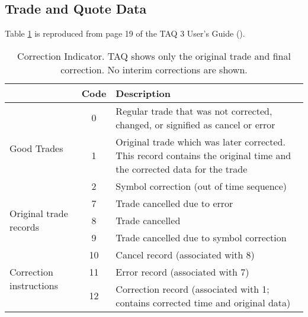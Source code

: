 \begin{landscape}

\section{Trade and Quote Data}
\label{appx:taq}

Table \ref{table:appx_taq_corr} is reproduced from page 19 of the TAQ 3 User's Guide (\cite{TAQUserGuide}).

\begin{table}
\centering

\begin{tabular}{l|c|l|}
    \cline{2-3}
	 & Code & Description \\
    \hline
    \multirow{3}{*}{Good Trades} & 0 & Regular trade that was not corrected, changed, or signified as cancel or error \\
     							 & 1 & Original trade which was later corrected. This record contains the original time and the corrected data for the trade \\
                                 & 2 & Symbol correction (out of time sequence) \\
    \hline
	\multirow{3}{*}{Original trade records} & 7 & Trade cancelled due to error \\
     							            & 8 & \textbullet Trade cancelled \\
                                            & 9 & Trade cancelled due to symbol correction \\
    \hline
    \multirow{3}{*}{Correction instructions} & 10 & Cancel record (associated with 8) \\
     							             & 11 & Error record (associated with 7) \\
                                             & 12 & Correction record (associated with 1; contains corrected time and original data) \\
    \hline
\end{tabular}

\caption{Correction Indicator. TAQ shows only the original trade and final correction. No interim corrections are shown.}
\label{table:appx_taq_corr}
\end{table}

\end{landscape}